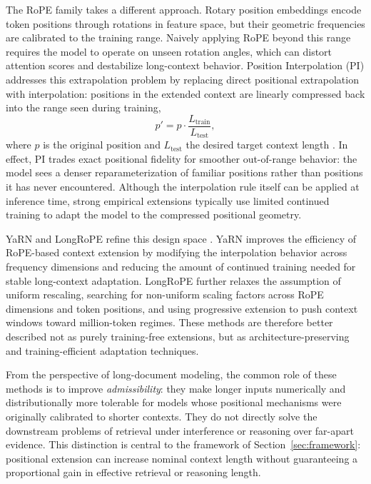 \documentclass[11pt]{article}
\begin{document}
The RoPE family takes a different approach. Rotary position embeddings encode token positions through rotations in feature space, but their geometric frequencies are calibrated to the training range. Naively applying RoPE beyond this range requires the model to operate on unseen rotation angles, which can distort attention scores and destabilize long-context behavior. Position Interpolation (PI) addresses this extrapolation problem by replacing direct positional extrapolation with interpolation: positions in the extended context are linearly compressed back into the range seen during training,
\begin{equation}
p' = p \cdot \frac{L_{\mathrm{train}}}{L_{\mathrm{test}}},
\end{equation}
where $p$ is the original position and $L_{\mathrm{test}}$ the desired target context length \citep{chen2023pi}. In effect, PI trades exact positional fidelity for smoother out-of-range behavior: the model sees a denser reparameterization of familiar positions rather than positions it has never encountered. Although the interpolation rule itself can be applied at inference time, strong empirical extensions typically use limited continued training to adapt the model to the compressed positional geometry.

YaRN and LongRoPE refine this design space \citep{peng2023yarn, ding2024longrope}. YaRN improves the efficiency of RoPE-based context extension by modifying the interpolation behavior across frequency dimensions and reducing the amount of continued training needed for stable long-context adaptation. LongRoPE further relaxes the assumption of uniform rescaling, searching for non-uniform scaling factors across RoPE dimensions and token positions, and using progressive extension to push context windows toward million-token regimes. These methods are therefore better described not as purely training-free extensions, but as architecture-preserving and training-efficient adaptation techniques.

From the perspective of long-document modeling, the common role of these methods is to improve \emph{admissibility}: they make longer inputs numerically and distributionally more tolerable for models whose positional mechanisms were originally calibrated to shorter contexts. They do not directly solve the downstream problems of retrieval under interference or reasoning over far-apart evidence. This distinction is central to the framework of Section~\ref{sec:framework}: positional extension can increase nominal context length without guaranteeing a proportional gain in effective retrieval or reasoning length.
\end{document}

